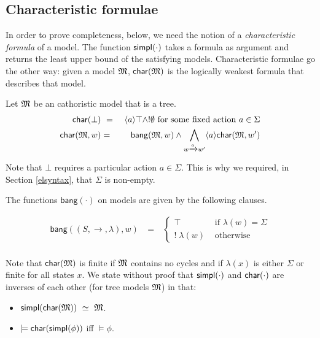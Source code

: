 \subsection{Characteristic formulae}

In order to prove completeness, below, we need the notion of a
\emph{characteristic formula} of a model.  The function
$\mathsf{simpl}(\cdot)$ takes a formula as argument and returns
the least upper bound of the satisfying models. Characteristic formulae go the other way: given a model
$\frak{M}$, $\mathsf{char}(\frak{M})$ is the logically weakest formula that describes that model. 
\clearpage

\clearpage

\begin{definition}
Let $\frak{M}$ be an cathoristic model that is a tree.
\begin{eqnarray*}
  \mathsf{char}(\bot) &\ =\ & \langle a \rangle \top \land ! \emptyset  \mbox{ for some fixed action }a \in \Sigma  \\
  \mathsf{char}(\frak{M}, w) & = & \mathsf{bang}(\frak{M},w) \land \bigwedge_{w \xrightarrow{a} w'} \langle a \rangle \mathsf{char}(\frak{M}, w')  
\end{eqnarray*}

\end{definition}

\NI Note that $\bot$ requires a particular action $a \in \Sigma$. This
is why we required, in Section \ref{elsyntax}, that $\Sigma$ is
non-empty.

The functions $\mathsf{bang}(\cdot)$ on models are given by the
following clauses.

\begin{eqnarray*}
  \mathsf{bang}((S,\rightarrow,\lambda),w) 
     & \ = \ & 
  \begin{cases}
    \top & \mbox{ if } \lambda(w) = \Sigma  \\
    ! \; \lambda(w) & \mbox{ otherwise }  
  \end{cases} \\
\end{eqnarray*}

\NI Note that $\mathsf{char}(\frak{M})$ is finite if $\frak{M}$ contains no cycles and
if $\lambda(x)$ is either $\Sigma$ or finite for all states $x$.  We
state without proof that $\mathsf{simpl}(\cdot)$ and $\mathsf{char}(\cdot)$ are
inverses of each other (for tree models $\frak{M}$) in that:

\begin{itemize}

\item $\mathsf{simpl}(\mathsf{char}(\frak{M})) \ \simeq \  \frak{M}$. 

\item $\models \mathsf{char}(\mathsf{simpl}(\phi))$ iff $\models\phi$.

\end{itemize}


